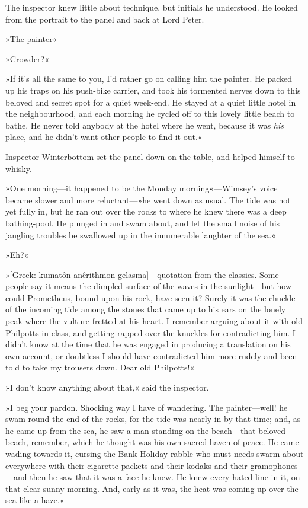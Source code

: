 The inspector knew little about technique, but initials he understood. He looked from the portrait to the panel and back at Lord Peter.

»The painter\longdash«

»Crowder?«

»If it's all the same to you, I'd rather go on calling him the painter. He packed up his traps on his push-bike carrier, and took his tormented nerves down to this beloved and secret spot for a quiet week-end. He stayed at a quiet little hotel in the neighbourhood, and each morning he cycled off to this lovely little beach to bathe. He never told anybody at the hotel where he went, because it was \textit{his} place, and he didn't want other people to find it out.«

Inspector Winterbottom set the panel down on the table, and helped himself to whisky.

»One morning—it happened to be the Monday morning«—Wimsey's voice became slower and more reluctant—»he went down as usual. The tide was not yet fully in, but he ran out over the rocks to where he knew there was a deep bathing-pool. He plunged in and swam about, and let the small noise of his jangling troubles be swallowed up in the innumerable laughter of the sea.«

»Eh?«

»[Greek: kumatôn anêrithmon gelasma]—quotation from the classics. Some people say it means the dimpled surface of the waves in the sunlight—but how could Prometheus, bound upon his rock, have seen it? Surely it was the chuckle of the incoming tide among the stones that came up to his ears on the lonely peak where the vulture fretted at his heart. I remember arguing about it with old Philpotts in class, and getting rapped over the knuckles for contradicting him. I didn't know at the time that he was engaged in producing a translation on his own account, or doubtless I should have contradicted him more rudely and been told to take my trousers down. Dear old Philpotts!«

»I don't know anything about that,« said the inspector.

»I beg your pardon. Shocking way I have of wandering. The painter—well! he swam round the end of the rocks, for the tide was nearly in by that time; and, as he came up from the sea, he saw a man standing on the beach—that beloved beach, remember, which he thought was his own sacred haven of peace. He came wading towards it, cursing the Bank Holiday rabble who must needs swarm about everywhere with their cigarette-packets and their kodaks and their gramophones—and then he saw that it was a face he knew. He knew every hated line in it, on that clear sunny morning. And, early as it was, the heat was coming up over the sea like a haze.«

